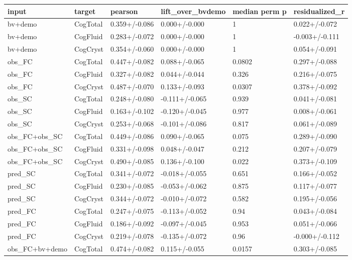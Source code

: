 {\def\LTcaptype{none} %
\begin{longtable}[]{@{}llllll@{}}
\toprule\noalign{}
input & target & pearson & lift\_over\_bvdemo & median perm p & residualized\_r \\
\midrule\noalign{}
\endhead
\bottomrule\noalign{}
\endlastfoot
bv+demo & CogTotal & 0.359+/-0.086 & 0.000+/-0.000 & 1 & 0.022+/-0.072 \\
bv+demo & CogFluid & 0.283+/-0.072 & 0.000+/-0.000 & 1 & -0.003+/-0.111 \\
bv+demo & CogCryst & 0.354+/-0.060 & 0.000+/-0.000 & 1 & 0.054+/-0.091 \\
obs\_FC & CogTotal & 0.447+/-0.082 & 0.088+/-0.065 & 0.0802 & 0.297+/-0.088 \\
obs\_FC & CogFluid & 0.327+/-0.082 & 0.044+/-0.044 & 0.326 & 0.216+/-0.075 \\
obs\_FC & CogCryst & 0.487+/-0.070 & 0.133+/-0.093 & 0.0307 & 0.378+/-0.092 \\
obs\_SC & CogTotal & 0.248+/-0.080 & -0.111+/-0.065 & 0.939 & 0.041+/-0.081 \\
obs\_SC & CogFluid & 0.163+/-0.102 & -0.120+/-0.045 & 0.977 & 0.008+/-0.061 \\
obs\_SC & CogCryst & 0.253+/-0.068 & -0.101+/-0.086 & 0.817 & 0.061+/-0.089 \\
obs\_FC+obs\_SC & CogTotal & 0.449+/-0.086 & 0.090+/-0.065 & 0.075 & 0.289+/-0.090 \\
obs\_FC+obs\_SC & CogFluid & 0.331+/-0.098 & 0.048+/-0.047 & 0.212 & 0.207+/-0.079 \\
obs\_FC+obs\_SC & CogCryst & 0.490+/-0.085 & 0.136+/-0.100 & 0.022 & 0.373+/-0.109 \\
pred\_SC & CogTotal & 0.341+/-0.072 & -0.018+/-0.055 & 0.651 & 0.166+/-0.052 \\
pred\_SC & CogFluid & 0.230+/-0.085 & -0.053+/-0.062 & 0.875 & 0.117+/-0.077 \\
pred\_SC & CogCryst & 0.344+/-0.072 & -0.010+/-0.072 & 0.582 & 0.195+/-0.056 \\
pred\_FC & CogTotal & 0.247+/-0.075 & -0.113+/-0.052 & 0.94 & 0.043+/-0.084 \\
pred\_FC & CogFluid & 0.186+/-0.092 & -0.097+/-0.045 & 0.953 & 0.051+/-0.066 \\
pred\_FC & CogCryst & 0.219+/-0.078 & -0.135+/-0.072 & 0.96 & -0.000+/-0.112 \\
obs\_FC+bv+demo & CogTotal & 0.474+/-0.082 & 0.115+/-0.055 & 0.0157 & 0.303+/-0.085 \\

\end{longtable}}
